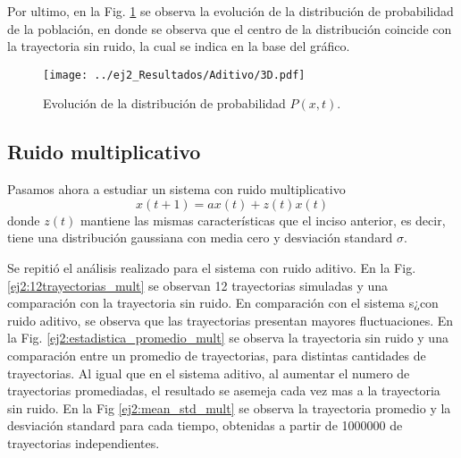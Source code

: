 Por ultimo, en la Fig. \ref{ej2:3D} se observa la evolución de la distribución de probabilidad de la población, en donde se observa que el centro de la distribución coincide con la trayectoria sin ruido, la cual se indica en la base del gráfico.

\begin{figure}[htb!]
    \centering
    \texttt{[image: ../ej2\_Resultados/Aditivo/3D.pdf]}
    \caption{Evolución de la distribución de probabilidad $P\left(x,t\right)$.}
    \label{ej2:3D}
\end{figure}


\subsection*{Ruido multiplicativo}

Pasamos ahora a estudiar un sistema con ruido multiplicativo
\begin{equation}
    x\left(t+1\right) = a x \left(t\right) + z\left(t\right) x\left(t\right) 
\end{equation}
donde $z\left(t\right)$ mantiene las mismas características que el inciso anterior, es decir, tiene una distribución gaussiana con media cero y desviación standard $\sigma$. 

Se repitió el análisis realizado para el sistema con ruido aditivo. En la Fig. \ref{ej2:12trayectorias_mult} se observan 12 trayectorias simuladas y una comparación con la trayectoria sin ruido. En comparación con el sistema s¿con ruido aditivo, se observa que las trayectorias presentan mayores fluctuaciones. En la Fig. \ref{ej2:estadistica_promedio_mult} se observa la trayectoria sin ruido y una comparación entre un promedio de trayectorias, para distintas cantidades de trayectorias. Al igual que en el sistema aditivo, al aumentar el numero de trayectorias promediadas, el resultado se asemeja cada vez mas a la trayectoria sin ruido. En la Fig \ref{ej2:mean_std_mult} se observa la trayectoria promedio y la desviación standard para cada tiempo, obtenidas a partir de 1000000 de trayectorias independientes.


